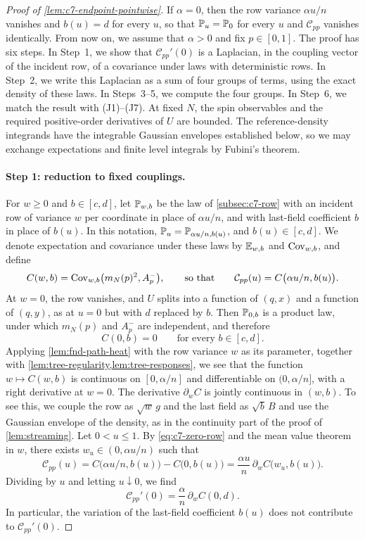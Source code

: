 \begin{proof}[Proof of \cref{lem:c7-endpoint-pointwise}]
If $\alpha=0$, then the row variance $\alpha u/n$ vanishes and
$b(u)=d$ for every $u$, so that $\mathbb P_u=\mathbb P_0$ for every $u$ and
$\mathcal C_{pp}$ vanishes identically. From now on, we assume that
$\alpha>0$ and fix $p\in[0,1]$. The proof has six steps. In Step~1,
we show that $\mathcal C_{pp}'(0)$ is a Laplacian, in the coupling
vector of the incident row, of a covariance under laws with
deterministic rows. In Step~2, we write this Laplacian as a sum of four
groups of terms, using the exact density of these laws. In Steps~3--5,
we compute the four groups. In Step~6, we match the result with
(J1)--(J7). At fixed $N$, the spin observables and the required
positive-order derivatives of $U$ are bounded. The reference-density
integrands have the integrable Gaussian envelopes established below, so
we may exchange expectations and finite level integrals by Fubini's
theorem.

\paragraph{Step 1: reduction to fixed couplings.}
For $w\ge0$ and $b\in[c,d]$, let $\mathbb P_{w,b}$ be the law of
\cref{subsec:c7-row} with an incident row of variance $w$ per
coordinate in place of $\alpha u/n$, and with last-field coefficient
$b$ in place of $b(u)$. In this notation, $\mathbb P_u=\mathbb P_{\alpha u/n,b(u)}$,
and $b(u)\in[c,d]$. We denote expectation and covariance under these laws by
$\mathbb E_{w,b}$ and $\operatorname{Cov}_{w,b}$, and define
\[
 C(w,b)=\operatorname{Cov}_{w,b}\bigl(m_N(p)^2,A_p^-\bigr),
 \qquad\text{so that}\qquad
 \mathcal C_{pp}(u)=C\bigl(\alpha u/n,b(u)\bigr).
\]
At $w=0$, the row vanishes, and $U$ splits into a function of $(q,x)$
and a function of $(q,y)$, as at $u=0$ but with $d$ replaced by $b$.
Then $\mathbb P_{0,b}$ is a product law, under which $m_N(p)$ and $A_p^-$
are independent, and therefore
\begin{equation}\label{eq:c7-zero-row}
 C(0,b)=0\qquad\text{for every }b\in[c,d].
\end{equation}
Applying \cref{lem:fnd-path-heat} with the row variance $w$ as its
parameter, together with \cref{lem:tree-regularity,lem:tree-responses},
we see that the function $w\mapsto C(w,b)$ is continuous on $[0,\alpha/n]$ and
differentiable on $(0,\alpha/n]$, with a right derivative at $w=0$.
The derivative $\partial_wC$ is jointly continuous in $(w,b)$. To see
this, we couple the row as $\sqrt w\,g$ and the last field as
$\sqrt b\,B$ and use the Gaussian envelope of the density, as in
the continuity part of the proof of \cref{lem:streaming}. Let
$0<u\le1$. By \eqref{eq:c7-zero-row} and the mean value theorem in
$w$, there exists $w_u\in(0,\alpha u/n)$ such that
\[
 \mathcal C_{pp}(u)=C\bigl(\alpha u/n,b(u)\bigr)-C\bigl(0,b(u)\bigr)
 =\frac{\alpha u}n\,\partial_wC\bigl(w_u,b(u)\bigr).
\]
Dividing by $u$ and letting $u\downarrow0$, we find
\begin{equation}\label{eq:c7-row-only}
 \mathcal C_{pp}'(0)=\frac\alpha n\,\partial_wC(0,d).
\end{equation}
In particular, the variation of the last-field coefficient $b(u)$
does not contribute to $\mathcal C_{pp}'(0)$.


\end{proof}
